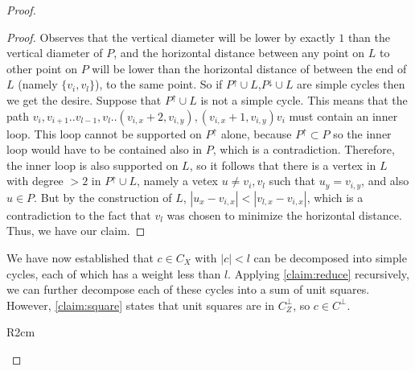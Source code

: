\begin{proof}
\begin{proof}
Observes that the vertical diameter will be lower by exactly $1$ than the vertical diameter of $P$, and the horizontal distance between any point on $L$ to other point on $P$ will be lower than the horizontal distance of between the end of $L$ (namely $\{v_{i},v_{l}\}$), to the same point. So if $P^{\uparrow}\cup L$,$P^{\downarrow}\cup L$ are simple cycles then we get the desire. 
Suppose that $P^{\uparrow}\cup L$ is not a simple cycle. This means that the path $v_{i},v_{i+1}..v_{l-1},v_{l}.. \left( v_{i,x}+2, v_{i,y} \right), \left( v_{i,x}+1, v_{i,y} \right)v_{i}$ must contain an inner loop. This loop cannot be supported on $P^{\uparrow}$ alone, because $P^{\uparrow} \subset P$ so the inner loop would have to be contained also in $P$, which is a contradiction. Therefore, the inner loop is also supported on $L$, so it follows that there is a vertex in $L$ with degree $>2$ in $P^{\uparrow}\cup L$, namely a vetex $u \neq v_{i},v_{l}$ such that $u_{y} = v_{i,y}$, and also $u \in P$. But by the construction of $L$, $|u_{x} - v_{i,x}| < |v_{l,x} - v_{i,x}|$, which is a contradiction to the fact that $v_{l}$ was chosen to minimize the horizontal distance. Thus, we have our claim.
  \end{proof}


We have now established that $c \in C_{X}$ with $|c| < l$ can be decomposed into simple cycles, each of which has a weight less than $l$. Applying \cref{claim:reduce} recursively, we can further decompose each of these cycles into a sum of unit squares. However, \cref{claim:square} states that unit squares are in $C_{Z}^{\perp}$, so $c \in C^{\perp}$.
    \begin{wrapfigure}{R}{2cm}
\end{wrapfigure}
%


\end{proof}
